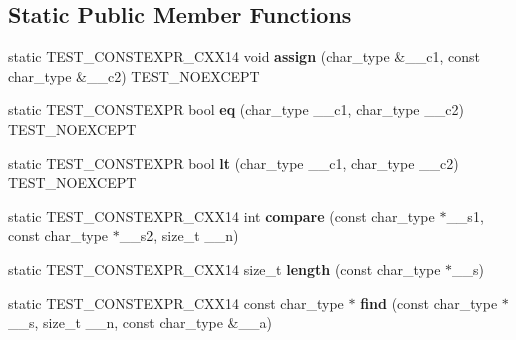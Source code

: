 \subsection*{Static Public Member Functions}
\begin{DoxyCompactItemize}
\item 
\mbox{\label{structconstexpr__char__traits_aea319a08e9657d0520b7e52be797b8fe}} 
static T\+E\+S\+T\+\_\+\+C\+O\+N\+S\+T\+E\+X\+P\+R\+\_\+\+C\+X\+X14 void {\bfseries assign} (char\+\_\+type \&\+\_\+\+\_\+c1, const char\+\_\+type \&\+\_\+\+\_\+c2) T\+E\+S\+T\+\_\+\+N\+O\+E\+X\+C\+E\+PT
\item 
\mbox{\label{structconstexpr__char__traits_ac26b9a3f83972c1f09616ae6f7e2eb80}} 
static T\+E\+S\+T\+\_\+\+C\+O\+N\+S\+T\+E\+X\+PR bool {\bfseries eq} (char\+\_\+type \+\_\+\+\_\+c1, char\+\_\+type \+\_\+\+\_\+c2) T\+E\+S\+T\+\_\+\+N\+O\+E\+X\+C\+E\+PT
\item 
\mbox{\label{structconstexpr__char__traits_a0583af0c53a1f2e0afc28724647ae30f}} 
static T\+E\+S\+T\+\_\+\+C\+O\+N\+S\+T\+E\+X\+PR bool {\bfseries lt} (char\+\_\+type \+\_\+\+\_\+c1, char\+\_\+type \+\_\+\+\_\+c2) T\+E\+S\+T\+\_\+\+N\+O\+E\+X\+C\+E\+PT
\item 
\mbox{\label{structconstexpr__char__traits_a4ea316c89b226262722266457727bb48}} 
static T\+E\+S\+T\+\_\+\+C\+O\+N\+S\+T\+E\+X\+P\+R\+\_\+\+C\+X\+X14 int {\bfseries compare} (const char\+\_\+type $\ast$\+\_\+\+\_\+s1, const char\+\_\+type $\ast$\+\_\+\+\_\+s2, size\+\_\+t \+\_\+\+\_\+n)
\item 
\mbox{\label{structconstexpr__char__traits_ac8db4a03a2cdaa6956883248a66e9dc9}} 
static T\+E\+S\+T\+\_\+\+C\+O\+N\+S\+T\+E\+X\+P\+R\+\_\+\+C\+X\+X14 size\+\_\+t {\bfseries length} (const char\+\_\+type $\ast$\+\_\+\+\_\+s)
\item 
\mbox{\label{structconstexpr__char__traits_ac6571517b28e14381f786278ed0b4ae4}} 
static T\+E\+S\+T\+\_\+\+C\+O\+N\+S\+T\+E\+X\+P\+R\+\_\+\+C\+X\+X14 const char\+\_\+type $\ast$ {\bfseries find} (const char\+\_\+type $\ast$\+\_\+\+\_\+s, size\+\_\+t \+\_\+\+\_\+n, const char\+\_\+type \&\+\_\+\+\_\+a)

\end{DoxyCompactItemize}
